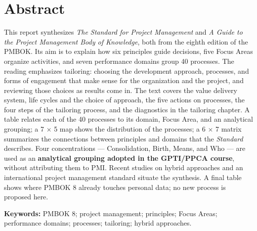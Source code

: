 \documentclass[11pt,a4paper]{article}
\newcommand{\onelineskip}{\baselineskip}
\newenvironment{resumo}[1][Abstract]{\section*{#1}\noindent\ignorespaces}{\bigskip}
\begin{document}
\begin{resumo}[Abstract]
This report synthesizes \textit{The Standard for Project Management} and \textit{A Guide to the Project Management Body of Knowledge}, both from the eighth edition of the PMBOK. Its aim is to explain how six principles guide decisions, five Focus Areas organize activities, and seven performance domains group 40 processes. The reading emphasizes tailoring: choosing the development approach, processes, and forms of engagement that make sense for the organization and the project, and reviewing those choices as results come in. The text covers the value delivery system, life cycles and the choice of approach, the five actions on processes, the four steps of the tailoring process, and the diagnostics in the tailoring chapter. A table relates each of the 40 processes to its domain, Focus Area, and an analytical grouping; a 7 \ensuremath{\times} 5 map shows the distribution of the processes; a 6 \ensuremath{\times} 7 matrix summarizes the connections between principles and domains that the \textit{Standard} describes. Four concentrations — Consolidation, Birth, Means, and Who — are used as an \textbf{analytical grouping adopted in the GPTI/PPCA course}, without attributing them to PMI. Recent studies on hybrid approaches and an international project management standard situate the synthesis. A final table shows where PMBOK 8 already touches personal data; no new process is proposed here.

\vspace{\onelineskip}
\noindent\textbf{Keywords:} PMBOK 8; project management; principles; Focus Areas; performance domains; processes; tailoring; hybrid approaches.
\end{resumo}
\end{document}
